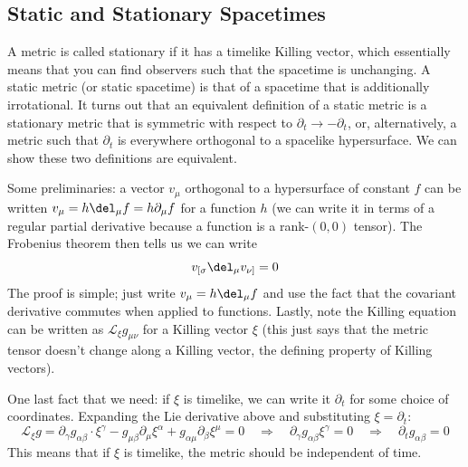 \documentclass{report}
\begin{document}

\subsection{Static and Stationary Spacetimes}
A metric is called stationary if it has a timelike Killing vector, which 
essentially means that you can find observers such that the spacetime is 
unchanging. A static metric (or static spacetime) is that of a spacetime that is 
additionally irrotational. It turns out that an equivalent definition of a static 
metric is a stationary metric that is symmetric with respect to $ \partial_t 
\rightarrow -\partial_t $, or, alternatively, a metric such that $ \partial_t $ 
is everywhere orthogonal to a spacelike hypersurface. We can show these two 
definitions are equivalent. 

Some preliminaries: a vector $ v_\mu $ orthogonal to a hypersurface of constant 
$ f $ can be written $ v_\mu = h \del_\mu f = h \partial_\mu f $ for a function 
$ h $ (we can write it in terms of a regular partial derivative because a function 
is a rank-$ (0, 0) $ tensor). The Frobenius theorem then tells us we can write 
\begin{equation}
	v_{[\sigma}\del_\mu v_{\nu]} = 0
\end{equation}
The proof is simple; just write $ v_\mu = h\del_\mu f $ and use the fact that the 
covariant derivative commutes when applied to functions. Lastly, note the
Killing equation can be written as $ \mathcal{L}_\xi g_{\mu\nu} $ for a Killing 
vector $ \xi $ (this just says that the metric tensor doesn't change along a Killing 
vector, the defining property of Killing vectors). 

One last fact that we need: if $ \xi $ is timelike, we can write it $ \partial_t $
for some choice of coordinates. Expanding the Lie derivative above and substituting 
$ \xi=\partial_t $: 
\begin{equation*}
	\mathcal{L}_\xi g = \partial_\gamma g_{\alpha \beta} \cdot \xi^\gamma
		- g_{\mu\beta}\partial_\mu \xi^\alpha 
		+ g_{\alpha\mu} \partial_\beta \xi^\mu
	= 0 \quad\Longrightarrow \quad
	\partial_\gamma g_{\alpha \beta} \xi^\gamma
	= 0 \quad \Longrightarrow \quad 
	\partial_t g_{\alpha\beta} = 0
\end{equation*}
This means that if $ \xi $ is timelike, the metric should be independent of 
time. 
\end{document}
